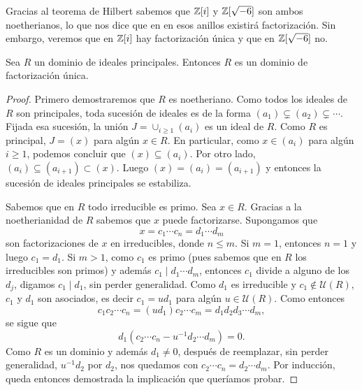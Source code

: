 \begin{example}
Gracias al teorema de Hilbert sabemos que $\mathbb{Z}[i]$ y $\mathbb{Z}[\sqrt{-6}]$ son ambos noetherianos, lo que nos dice que 
en en esos anillos existirá factorización. Sin embargo, veremos que en $\mathbb{Z}[i]$ hay factorización única y que en $\mathbb{Z}[\sqrt{-6}]$ no. 
\end{example}

\begin{theorem}
Sea $R$ un dominio de ideales principales. 
Entonces $R$ es un dominio de factorización única.
\end{theorem}

\begin{proof}
Primero demostraremos que $R$ es noetheriano. Como todos los ideales de $R$ son principales, toda sucesión de ideales es
de la forma $(a_1)\subsetneq (a_2)\subsetneq\cdots$. Fijada esa sucesión, la unión 
$J=\cup_{i\geq 1}(a_i)$ es un ideal de $R$. Como $R$ es principal, $J=(x)$ para algún $x\in R$. En particular, como $x\in (a_i)$ para algún $i\geq1$, 
podemos concluir que $(x)\subseteq (a_i)$. Por otro lado, $(a_i)\subseteq (a_{i+1})\subset (x)$. Luego
$(x)=(a_i)=(a_{i+1})$ y entonces la sucesión de ideales principales se estabiliza. 

Sabemos que en $R$ todo irreducible es primo. Sea $x\in R$. Gracias a la noetherianidad de $R$ sabemos que $x$ puede factorizarse. Supongamos que 
\[
x=c_1\cdots c_n=d_1\cdots d_m
\]
son factorizaciones de $x$ en irreducibles, donde $n\leq m$. 
Si $m=1$, entonces $n=1$ y luego $c_1=d_1$. Si $m>1$, como $c_1$ es primo (pues sabemos 
que en $R$ los irreducibles son primos) y además $c_1\mid d_1\cdots d_m$, 
entonces $c_1$ divide a alguno de los $d_j$, digamos $c_1\mid d_1$, sin perder generalidad. 
Como $d_1$ es irreducible y $c_1\not\in\mathcal{U}(R)$, 
$c_1$ y $d_1$ son asociados, es decir $c_1=ud_1$ para algún $u\in\mathcal{U}(R)$. Como entonces 
\[
c_1c_2\cdots c_n=(ud_1)c_2\cdots c_m=d_1d_2d_3\cdots d_m,
\]
se sigue que 
\[
d_1(c_2\cdots c_n-u^{-1}d_2\cdots d_m)=0.
\]
Como $R$ es un dominio y además $d_1\ne 0$, 
después de reemplazar, sin perder generalidad, $u^{-1}d_2$ por $d_2$, nos quedamos con $c_2\cdots c_n=d_2\cdots d_m$. Por inducción, queda entonces
demostrada la implicación que queríamos probar.
\end{proof}


